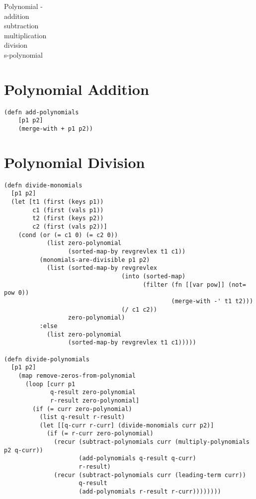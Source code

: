 \documentclass[20pt]{extarticle}
\begin{document}
Polynomial - \\
\indent addition \\
\indent subtraction     \\   
\indent multiplication \\
\indent division \\
\indent s-polynomial \\


\newpage
\section*{Polynomial Addition}
\begin{verbatim}
(defn add-polynomials
    [p1 p2]
    (merge-with + p1 p2))
\end{verbatim}

\newpage
\section*{Polynomial Division}
{\tiny
\begin{verbatim}
(defn divide-monomials
  [p1 p2]
  (let [t1 (first (keys p1))
        c1 (first (vals p1))
        t2 (first (keys p2))
        c2 (first (vals p2))]
    (cond (or (= c1 0) (= c2 0))
            (list zero-polynomial
                  (sorted-map-by revgrevlex t1 c1))
          (monomials-are-divisible p1 p2)
            (list (sorted-map-by revgrevlex
                                 (into (sorted-map)
                                       (filter (fn [[var pow]] (not= pow 0))
                                               (merge-with -' t1 t2)))
                                 (/ c1 c2))
                  zero-polynomial)
          :else
            (list zero-polynomial
                  (sorted-map-by revgrevlex t1 c1)))))

(defn divide-polynomials
  [p1 p2]
    (map remove-zeros-from-polynomial
      (loop [curr p1
             q-result zero-polynomial
             r-result zero-polynomial]
        (if (= curr zero-polynomial)
          (list q-result r-result)
          (let [[q-curr r-curr] (divide-monomials curr p2)]
            (if (= r-curr zero-polynomial)
              (recur (subtract-polynomials curr (multiply-polynomials p2 q-curr))
                     (add-polynomials q-result q-curr)
                     r-result)
              (recur (subtract-polynomials curr (leading-term curr))
                     q-result
                     (add-polynomials r-result r-curr))))))))
\end{verbatim}
}
\end{document}
